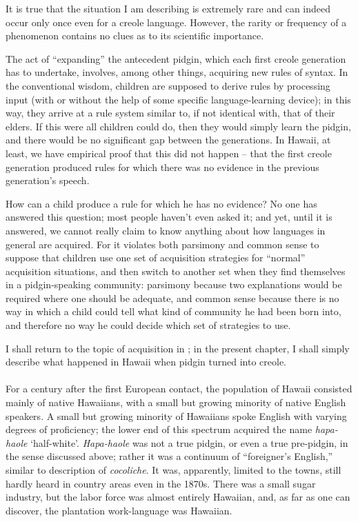 
It is true that the situation I am describing is extremely rare and can indeed occur only once even for a creole language. However, the rarity or frequency of a phenomenon contains no clues as to its scientific importance.

The act of ``expanding'' the antecedent pidgin, which each
first creole generation has to undertake, involves, among other things, acquiring new rules of syntax. In the conventional wisdom, children are supposed to derive rules by processing input (with or without the help of some specific language-learning device);  in this way, they arrive at a rule system similar to, if not identical with, that of their elders. If this were all children could do, then they would simply learn the pidgin, and there would be no significant gap between the generations. In Hawaii, at least, we have empirical proof that this did not happen -- that the first creole generation produced rules for which there was no evidence in the previous generation's speech.

How can a child produce a rule for which he has no evidence? No one has answered this question; most people haven't even asked it; and yet, until it is answered, we cannot really claim to know any\-thing about how languages in general are acquired. For it violates both parsimony and common sense to suppose that children use one set of acquisition strategies for ``normal'' acquisition situations, and then switch to another set when they find themselves in a pidgin-speaking community: parsimony because two explanations would be required where one should be adequate, and common sense because there is no way in which a child could tell what kind of community he had been born into, and therefore no way he could decide which
set of strategies to use.

I shall return to the topic of acquisition in ; in the present chapter, I shall simply describe what happened in Hawaii when pidgin turned into creole.\\\\

For a century after the first European contact, the population of Hawaii consisted mainly of native Hawaiians, with a small but growing minority of native English speakers. A small but growing
minority of Hawaiians spoke English with varying degrees of profi\-ciency; the lower end of this spectrum acquired the name \textit{hapa-haole} `half-white'. \textit{Hapa-haole} was not a true pidgin, or even a true pre-pidgin, in the sense discussed above; rather it was a continuum of ``foreigner's English,'' similar to  description of \textit{cocoliche}. It was, apparently, limited to the towns, still hardly heard in country areas even in the 1870s. There was a small sugar industry, but the labor force was almost entirely Hawaiian, and, as far as one can discover, the plantation work-language was Hawaiian.

